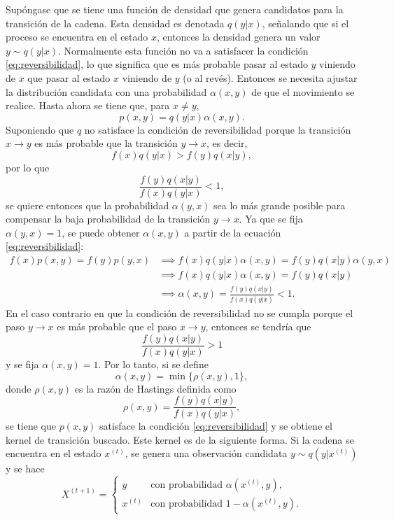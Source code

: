 \documentclass[11pt,a4paper]{article}
\begin{document}
Supóngase que se tiene una función de densidad que genera candidatos para la transición de la cadena. Esta densidad es denotada $q(y|x)$, señalando que si el proceso se encuentra en el estado $x$, entonces la densidad genera un valor $y \sim q(y|x)$. Normalmente esta función no va a satisfacer la condición \eqref{eq:reversibilidad}, lo que significa que es más probable pasar al estado $y$ viniendo de $x$ que pasar al estado $x$ viniendo de $y$ (o al revés). Entonces se necesita ajustar la distribución candidata con una probabilidad $\alpha (x, y)$ de que el movimiento se realice. Hasta ahora se tiene que, para $x \neq y$, $$p(x, y) = q(y | x) \alpha (x, y).$$ Suponiendo que $q$ no satisface la condición de reversibilidad porque la transición $x \to y$ es más probable que la transición $y \to x$, es decir, $$f(x)q(y|x) > f(y)q(x|y),$$ por lo que $$\frac{f(y)q(x|y)}{f(x)q(y|x)} < 1,$$ se quiere entonces que la probabilidad $\alpha(y, x)$ sea lo más grande posible para compensar la baja probabilidad de la transición $y \to x$. Ya que se fija $\alpha(y, x) = 1$, se puede obtener $\alpha(x, y)$ a partir de la ecuación \eqref{eq:reversibilidad}:
\begin{align*}
f(x)p(x, y) = f(y) p(y, x) &\implies f(x) q(y|x) \alpha(x, y) = f(y) q(x|y)\alpha (y, x)\\
&\implies f(x) q(y|x) \alpha(x, y) = f(y) q(x|y)\\
&\implies \alpha(x, y) = \frac{f(y)q(x|y)}{f(x)q(y|x)} < 1.
\end{align*}
En el caso contrario en que la condición de reversibilidad no se cumpla porque el paso $y \to x$ es más probable que el paso $x \to y$, entonces se tendría que $$\frac{f(y)q(x|y)}{f(x)q(y|x)} > 1$$ y se fija $\alpha(x, y) = 1$. Por lo tanto, si se define
\begin{equation}
\label{eq:prob_transicion}
\alpha(x, y) = \min \lbrace \rho(x, y), 1 \rbrace,
\end{equation}
donde $\rho(x, y)$ es la razón de Hastings definida como $$\rho(x, y) = \frac{f(y)q(x|y)}{f(x)q(y|x)},$$ se tiene que $p(x, y)$ satisface la condición \eqref{eq:reversibilidad} y se obtiene el kernel de transición buscado. Este kernel es de la siguiente forma. Si la cadena se encuentra en el estado $x^{(t)}$, se genera una observación candidata $y \sim q(y|x^{(t)})$ y se hace
\begin{equation}
\label{eq:mh}
X^{(t+1)} = \begin{cases} 
      y & \text{con probabilidad } \alpha(x^{(t)}, y),\\
      x^{(t)} & \text{con probabilidad } 1-\alpha(x^{(t)}, y).
   \end{cases}
\end{equation}
\end{document}
